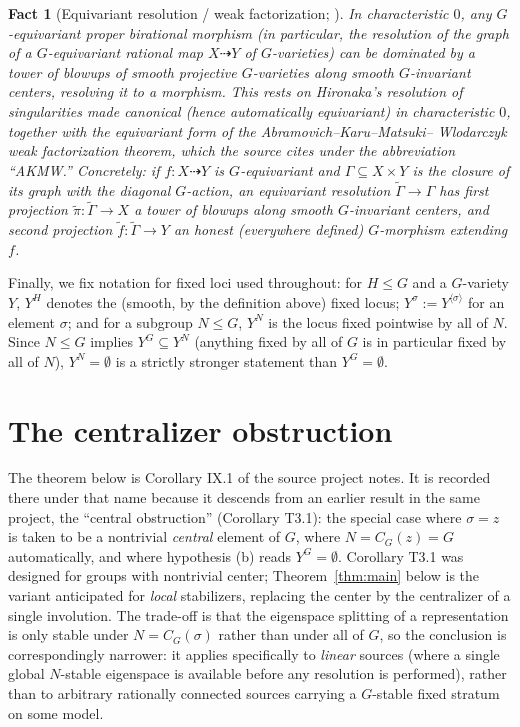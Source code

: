 \documentclass[11pt]{article}
\theoremstyle{plain}
\newtheorem{fact}[theorem]{Fact}
\theoremstyle{definition}
\theoremstyle{remark}
\newcommand{\dashto}{\dashrightarrow}
\begin{document}
\begin{fact}[Equivariant resolution / weak factorization; {\cite[Prop.\
3.3]{BComplex}}] \label{fact:resolution} In characteristic $0$, any
$G$-equivariant proper birational morphism (in particular, the
resolution of the graph of a $G$-equivariant rational map $X\dashto Y$
of $G$-varieties) can be dominated by a tower of blowups of smooth
projective $G$-varieties along smooth $G$-invariant centers, resolving
it to a morphism. This rests on Hironaka's resolution of singularities
made canonical (hence automatically equivariant) in characteristic $0$,
together with the equivariant form of the Abramovich--Karu--Matsuki--
Wlodarczyk weak factorization theorem, which the source cites under the
abbreviation ``AKMW.'' Concretely: if $f:X\dashto Y$ is $G$-equivariant
and $\Gamma\subseteq X\times Y$ is the closure of its graph with the
diagonal $G$-action, an equivariant resolution $\widetilde\Gamma\to
\Gamma$ has first projection $\widetilde\pi:\widetilde\Gamma\to X$ a
tower of blowups along smooth $G$-invariant centers, and second
projection $\widetilde f:\widetilde\Gamma\to Y$ an honest (everywhere
defined) $G$-morphism extending $f$.
\end{fact}

Finally, we fix notation for fixed loci used throughout: for $H\le G$
and a $G$-variety $Y$, $Y^H$ denotes the (smooth, by the definition
above) fixed locus; $Y^\sigma:=Y^{\langle\sigma\rangle}$ for an element
$\sigma$; and for a subgroup $N\le G$, $Y^N$ is the locus fixed
pointwise by all of $N$. Since $N\le G$ implies $Y^G\subseteq Y^N$
(anything fixed by all of $G$ is in particular fixed by all of $N$),
$Y^N=\emptyset$ is a strictly stronger statement than $Y^G=\emptyset$.

\section{The centralizer obstruction}
\label{sec:main}

The theorem below is Corollary IX.1 of the source project notes. It is
recorded there under that name because it descends from an earlier
result in the same project, the ``central obstruction'' (Corollary
T3.1): the special case where $\sigma=z$ is taken to be a nontrivial
\emph{central} element of $G$, where $N=C_G(z)=G$ automatically, and
where hypothesis (b) reads $Y^G=\emptyset$. Corollary T3.1 was designed
for groups with nontrivial center; Theorem~\ref{thm:main} below is the
variant anticipated for \emph{local} stabilizers, replacing the center
by the centralizer of a single involution. The trade-off is that the
eigenspace splitting of a representation is only stable under $N=C_G
(\sigma)$ rather than under all of $G$, so the conclusion is
correspondingly narrower: it applies specifically to \emph{linear}
sources (where a single global $N$-stable eigenspace is available
before any resolution is performed), rather than to arbitrary
rationally connected sources carrying a $G$-stable fixed stratum on
some model.
\end{document}
